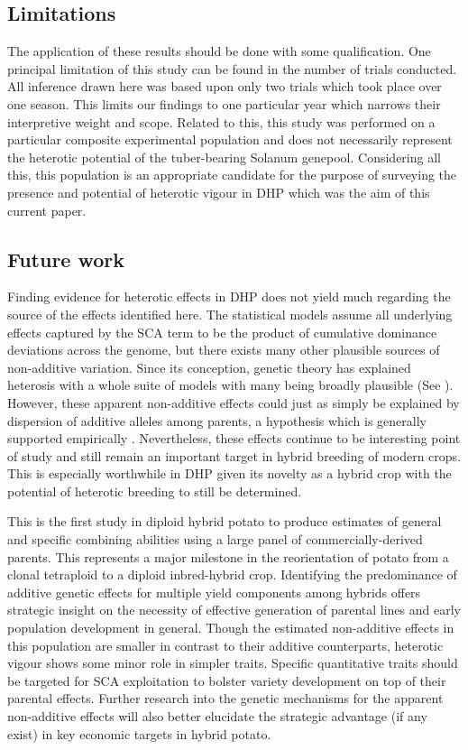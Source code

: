 \subsection{Limitations}\label{limitations}

The application of these results should be done with some qualification. One principal limitation of this study can be found in the number of trials conducted. All inference drawn here was based upon only two trials which took place over one season. This limits our findings to one particular year which narrows their interpretive weight and scope. Related to this, this study was performed on a particular composite experimental population and does not necessarily represent the heterotic potential of the tuber-bearing Solanum genepool. Considering all this, this population is an appropriate candidate for the purpose of surveying the presence and potential of heterotic vigour in DHP which was the aim of this current paper. 

\subsection{Future work}\label{future-work}

Finding evidence for heterotic effects in DHP does not yield much regarding the source of the effects identified here. The statistical models assume all underlying effects captured by the SCA term to be the product of cumulative dominance deviations across the genome, but there exists many other plausible sources of non-additive variation. Since its conception, genetic theory has explained heterosis with a whole suite of models with many being broadly plausible (See \cite{Labroo2021}). However, these apparent non-additive effects could just as simply be explained by dispersion of additive alleles among parents, a hypothesis which is generally supported empirically \parencite{Pearson1983, Mackay2021}. Nevertheless, these effects continue to be interesting point of study and still remain an important target in hybrid breeding of modern crops. This is especially worthwhile in DHP given its novelty as a hybrid crop with the potential of heterotic breeding to still be determined.


This is the first study in diploid hybrid potato to produce estimates of general and specific combining abilities using a large panel of commercially-derived parents. This represents a major milestone in the reorientation of potato from a clonal tetraploid to a diploid inbred-hybrid crop. Identifying the predominance of additive genetic effects for multiple yield components among hybrids offers strategic insight on the necessity of effective generation of parental lines and early population development in general. Though the estimated non-additive effects in this population are smaller in contrast to their additive counterparts, heterotic vigour shows some minor role in simpler traits. Specific quantitative traits should be targeted for SCA exploitation to bolster variety development on top of their parental effects. Further research into the genetic mechanisms for the apparent non-additive effects will also better elucidate the strategic advantage (if any exist) in key economic targets in hybrid potato.

